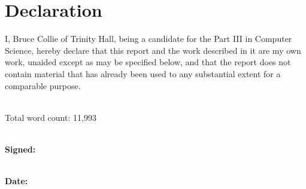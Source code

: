 \section*{Declaration}

I, Bruce Collie of Trinity Hall, being a candidate for the Part III in Computer
Science, hereby declare that this report and the work described in it are my own
work, unaided except as may be specified below, and that the report does not
contain material that has already been used to any substantial extent for a
comparable purpose.

\vspace{0.75cm}

\noindent
\\Total word count: 11,993

\vspace{0.75cm}

\noindent
\\\textbf{Signed:}

\vspace{0.75cm}

\noindent
\\\textbf{Date:}

